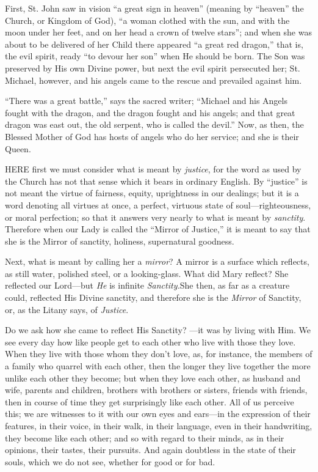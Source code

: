 First, St. John saw in vision ``a
great sign in heaven'' (meaning by ``heaven'' the Church, or Kingdom of
God), ``a woman clothed with the sun, and with the moon under her
feet, and on her head a crown of twelve stars''; and when she was about
to be delivered of her Child there appeared ``a great red dragon,'' that
is, the evil spirit, ready ``to devour her son'' when He should be born.
The Son was preserved by His own Divine power, but next the evil spirit
persecuted her; St. Michael, however, and his angels came to the rescue
and prevailed against him.

``There
was a great battle,'' says the sacred writer; ``Michael and his Angels
fought with the dragon, and the dragon fought and his angels; and that
great dragon was east out, the old serpent, who is called the devil.''
Now, as then, the Blessed Mother of God has hosts of angels who do her
service; and she is their Queen.



HERE
first we must consider what is meant by \emph{justice}, for the word as
used by the Church has not that sense which it bears in ordinary
English. By ``justice'' is not meant the virtue of fairness, equity,
uprightness in our dealings; but it is a word denoting all virtues at
once, a perfect, virtuous state of soul—righteousness, or moral
perfection; so that it answers very nearly to what is meant by \emph{sanctity}.
Therefore when our Lady is called the ``Mirror of Justice,'' it is meant
to say that she is the Mirror of sanctity, holiness, supernatural
goodness.

Next, what is meant by calling
her a \emph{mirror}? A mirror is a surface which reflects, as still
water, polished steel, or a looking-glass. What did Mary reflect? She
reflected our Lord—but \emph{He} is infinite \emph{Sanctity.}She
then, as far as a creature could, reflected His Divine sanctity, and
therefore she is the \emph{Mirror} of Sanctity, or, as the Litany says,
of \emph{Justice}.

Do we ask how she came to
reflect His Sanctity? —it was by living with Him. We see every
day how like people get to each other who live with those they love.
When they live with those whom they don't love, as, for instance, the
members of a family who quarrel with each other, then the longer they
live together the more unlike each other they become; but when they love
each other, as husband and wife, parents and children, brothers with
brothers or sisters, friends with friends, then in course of time they
get surprisingly like each other. All of us perceive this; we are
witnesses to it with our own eyes and ears—in the expression of their
features, in their voice, in their walk, in their language, even in
their handwriting, they become like each other; and so with regard to
their minds, as in their opinions, their tastes, their pursuits. And
again doubtless in the state of their souls, which we do not see,
whether for good or for bad.

